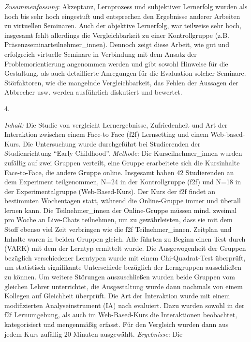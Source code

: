 \documentclass[12pt, bibliography=totoc]{scrartcl}
\begin{document}
\emph{Zusammenfassung}: Akzeptanz, Lernprozess und subjektiver
Lernerfolg wurden als hoch bis sehr hoch eingestuft und entsprechen den
Ergebnisse anderer Arbeiten zu virtuellen Seminaren. Auch der objektive
Lernerfolg, war teilweise sehr hoch, insgesamt fehlt allerdings die
Vergleichbarkeit zu einer Kontrollgruppe (z.B.
Präsenzseminarteilnehmer\_innen). Dennoch zeigt diese Arbeit, wie gut
und erfolgreich virtuelle Seminare in Verbindung mit dem Ansatz der
Problemorientierung angenommen werden und gibt sowohl Hinweise für die
Gestaltung, als auch detaillierte Anregungen für die Evaluation solcher
Seminare. Störfaktoren, wie die mangelnde Vergleichbarkeit, das Fehlen
der Aussagen der Abbrecher usw. werden ausführlich diskutiert und
bewertet.

4.

\emph{Inhalt:} Die Studie von \textcite{mentzer2007two} vergleicht
Lernergebnisse, Zufriedenheit und Art der Interaktion zwischen einem
Face-to Face (f2f) Lernsetting und einem Web-based-Kurs. Die
Untersuchung wurde durchgeführt bei Studierenden der Studienrichtung
``Early Childhood''. \emph{Methode:} Die Kurseilnehmer\_innen wurden
zufällig auf zwei Gruppen verteilt, eine Gruppe erarbeitete sich die
Kursinhalte Face-to-Face, die andere Gruppe online. Insgesamt haben 42
Studierenden an dem Experiment teilgenommen, N=24 in der Kontrollgruppe
(f2f) und N=18 in der Experimentalgruppe (Web-Based-Kurs). Der Kurs der
f2f findet an bestimmten Wochentagen statt, während die Online-Gruppe
immer und überall lernen kann. Die Teilnehmer\_innen der Online-Gruppe
müssen mind. zweimal pro Woche an Live-Chats teilnehmen, um zu
gewährleisten, dass sie mit dem Stoff ebenso viel Zeit verbringen wie
die f2f Teilnehmer\_innen. Zeitplan und Inhalte waren in beiden Gruppen
gleich. Alle führten zu Beginn einen Test durch (VARK) mit dem der
Lerntyp ermittelt wurde. Die Ausgewogenheit der Gruppen bezüglich
verschiedener Lerntypen wurde mit einem Chi-Quadrat-Test überprüft, um
statistisch signifikante Unterschiede bezüglich der Lerngruppen
ausschließen zu können. Um weitere Störungen auszuschließen wurden beide
Gruppen vom gleichen Lehrer unterrichtet, die Ausgestaltung wurde dann
nochmals von einem Kollegen auf Gleichheit überprüft. Die Art der
Interaktion wurde mit einem modifizierten Analyseinstrument (IA) nach
\textcite{Flanders1961} evaluiert. Dazu wurden sowohl in der f2f
Lernumgebung, als auch im Web-Based-Kurs die Interaktionen beobachtet,
kategorisiert und mengenmäßig erfasst. Für den Vergleich wurden dann aus
jedem Kurs zufällig 20 Minuten ausgewählt. \emph{Ergebnisse:} Die
\end{document}
